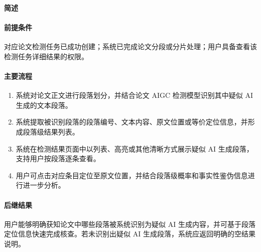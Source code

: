 \subsubsection{}

\paragraph*{简述}


\paragraph*{前提条件}

对应论文检测任务已成功创建；系统已完成论文分段或分片处理；用户具备查看该检测任务详细结果的权限。

\paragraph*{主要流程}

\begin{enumerate}
    \item 系统对论文正文进行段落划分，并结合论文 AIGC 检测模型识别其中疑似 AI 生成的文本段落。
    \item 系统提取被识别段落的段落编号、文本内容、原文位置或等价定位信息，并形成段落级结果列表。
    \item 系统在检测结果页面中以列表、高亮或其他清晰方式展示疑似 AI 生成段落，支持用户按段落逐条查看。
    \item 用户可点击对应条目定位至原文位置，并结合段落级概率和事实性鉴伪信息进行进一步分析。
\end{enumerate}

\paragraph*{后继结果}

用户能够明确获知论文中哪些段落被系统识别为疑似 AI 生成内容，并可基于段落定位信息快速完成核查。若未识别出疑似 AI 生成段落，系统应返回明确的空结果说明。

\subsubsection{}

